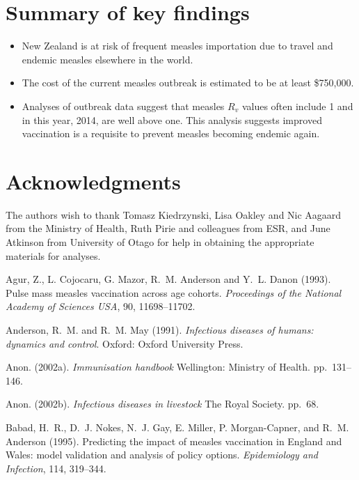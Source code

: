 \documentclass{article}
\begin{document}
{\section {Summary of key findings}
\begin{itemize}
\item New Zealand is at risk of frequent measles importation due to travel and endemic measles elsewhere in the world.
\item The cost of the current measles outbreak is estimated to be at least \$750,000.
\item Analyses of outbreak data suggest that measles $R_v$ values often include 1 and in this year, 2014, are well above one. This analysis suggests improved vaccination is a requisite to prevent measles becoming endemic again.
\end{itemize}

\section{Acknowledgments}
The authors wish to thank Tomasz Kiedrzynski, Lisa Oakley and Nic Aagaard from the Ministry of Health, Ruth Pirie and colleagues from ESR, and June Atkinson from University of Otago for help in obtaining the appropriate materials for analyses.

\begin{thebibliography}{}


Agur, Z., L. Cojocaru, G. Mazor, R.~M. Anderson and Y.~L. Danon (1993).
\newblock Pulse mass measles vaccination across age cohorts.
\newblock \emph{Proceedings of the National Academy of Sciences USA}, 90, 11698--11702.

Anderson, R.~M. and R.~M. May (1991).
\newblock \emph{Infectious diseases of humans: dynamics and control}. Oxford: Oxford University Press.

Anon. (2002a).
\newblock \emph{Immunisation handbook}
\newblock Wellington: Ministry of Health. pp.~131--146.

Anon. (2002b).
\newblock \emph{Infectious diseases in livestock}
\newblock The Royal Society. pp.~68.

Babad, H.~R., D.~J. Nokes, N.~J. Gay, E. Miller, P. Morgan-Capner, and R.~M. Anderson (1995).
\newblock Predicting the impact of measles vaccination in England and Wales: model validation and analysis of policy options.
\newblock \emph{Epidemiology and Infection}, 114, 319--344.


\end{thebibliography}}
\end{document}
